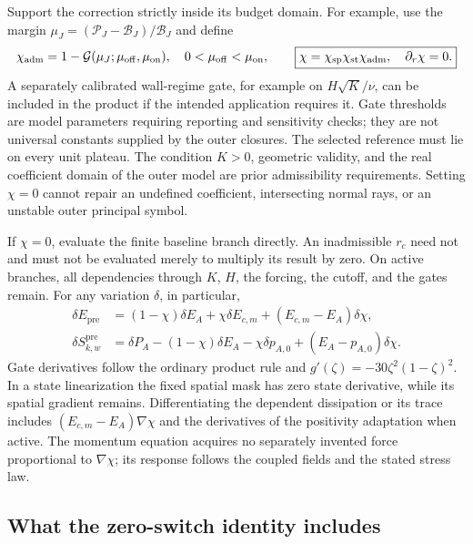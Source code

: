 \documentclass[11pt,a4paper]{article}
\numberwithin{equation}{section}
\begin{document}
Support the correction strictly inside its budget domain.  For
example, use the margin
$\mu_J=(\mathcal P_J-\mathcal B_J)/\mathcal B_J$ and define
\begin{equation}
 \chi_{\rm adm}=
 1-\mathcal G(\mu_J;\mu_{\rm off},\mu_{\rm on}),
 \quad 0<\mu_{\rm off}<\mu_{\rm on},\qquad
 \boxed{\chi=\chi_{\rm sp}\chi_{\rm st}\chi_{\rm adm},
 \quad\partial_r\chi=0.}
 \label{geo:correction-gate}
\end{equation}
A separately calibrated wall-regime gate, for example on
$H\sqrt K/\nu$, can be included in the product if the intended
application requires it.  Gate thresholds are model parameters
requiring reporting and sensitivity checks; they are not universal
constants supplied by the outer closures.  The selected reference
must lie on every unit plateau.  The condition $K>0$, geometric
validity, and the real coefficient domain of the outer model are
prior admissibility requirements.  Setting $\chi=0$ cannot repair
an undefined coefficient, intersecting normal rays, or an unstable
outer principal symbol.

If $\chi=0$, evaluate the finite baseline branch directly.  An
inadmissible $r_c$ need not and must not be evaluated merely to
multiply its result by zero.  On active branches, all dependencies
through $K$, $H$, the forcing, the cutoff, and the gates remain.
For any variation $\delta$, in particular,
\begin{equation}
 \begin{aligned}
 \delta E_{\mathrm{pre}}&=(1-\chi)\delta E_A+
 \chi\delta E_{c,m}+(E_{c,m}-E_A)\delta\chi,\\
 \delta S_{k,w}^{\mathrm{pre}}&=
 \delta P_A-(1-\chi)\delta E_A-\chi\delta p_{A,0}
                  +(E_A-p_{A,0})\delta\chi .
 \end{aligned}
 \label{geo:transition-derivatives}
\end{equation}
Gate derivatives follow the ordinary product rule and
$g'(\zeta)=-30\zeta^2(1-\zeta)^2$.  In a state linearization the
fixed spatial mask has zero state derivative, while its spatial
gradient remains.  Differentiating the dependent dissipation or
its trace includes $(E_{c,m}-E_A)\nabla\chi$ and the derivatives
of the positivity adaptation when active.  The momentum equation
acquires no separately invented force proportional to $\nabla\chi$;
its response follows the coupled fields and the stated stress law.

\subsection{What the zero-switch identity includes}
\end{document}
